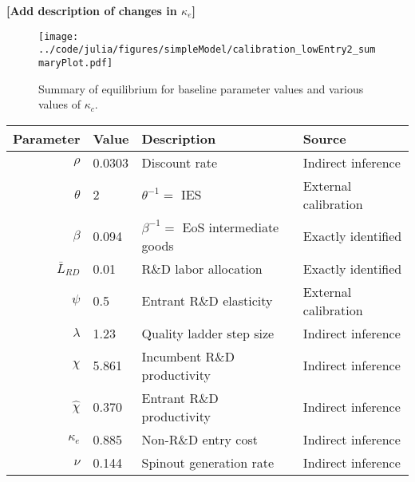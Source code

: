 \documentclass[11pt,english]{article}
\begin{document}
\textbf{[Add description of changes in $\kappa_e$]}

\begin{figure}[]
	\texttt{[image: ../code/julia/figures/simpleModel/calibration\_lowEntry2\_summaryPlot.pdf]}
	\caption{Summary of equilibrium for baseline parameter values and various values of $\kappa_c$.}
	\label{calibration_lowEntry_summaryPlot}
\end{figure}

\begin{table}[]
	\centering
	\label{calibration_lowEntry_parameters}
	\begin{tabular}{rlll}
		\toprule \toprule
		Parameter & Value & Description & Source \tabularnewline
		\midrule
		$\rho$ & 0.0303 & Discount rate  & Indirect inference \tabularnewline
		$\theta$ & 2 & $\theta^{-1} = $ IES & External calibration 
		\tabularnewline
		$\beta$ & 0.094 & $\beta^{-1} = $ EoS intermediate goods & Exactly identified \tabularnewline 
		$\bar{L}_{RD}$ & 0.01 & R\&D labor allocation  & Exactly identified \tabularnewline
		$\psi$ & 0.5 & Entrant R\&D elasticity & External calibration \tabularnewline
		$\lambda$ & 1.23 & Quality ladder step size & Indirect inference 
		\tabularnewline
		$\chi$ & 5.861 & Incumbent R\&D productivity & Indirect inference 
		\tabularnewline
		$\hat{\chi}$ & 0.370 & Entrant R\&D productivity & Indirect inference \tabularnewline 
		$\kappa_e$ & 0.885 & Non-R\&D entry cost & Indirect inference \tabularnewline
		$\nu$ & 0.144 & Spinout generation rate  & Indirect inference\tabularnewline
		\bottomrule
	\end{tabular}
\end{table}
\end{document}
